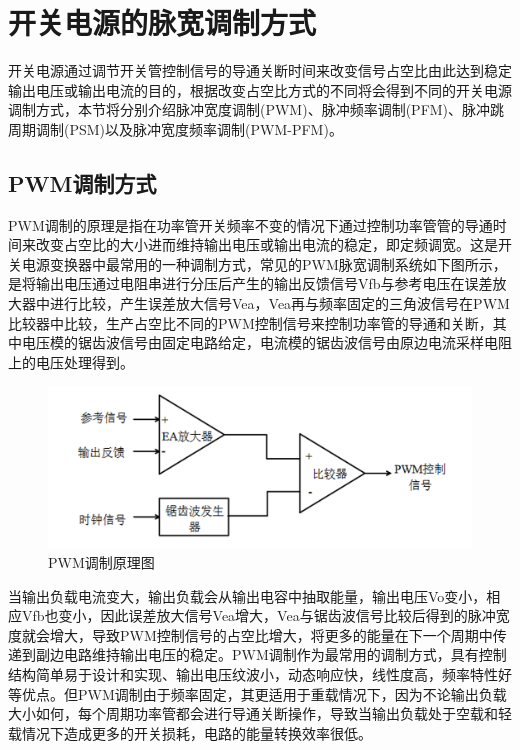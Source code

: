 								


\section{开关电源的脉宽调制方式}
开关电源通过调节开关管控制信号的导通关断时间来改变信号占空比由此达到稳定输出电压或输出电流的目的，根据改变占空比方式的不同将会得到不同的开关电源调制方式，本节将分别介绍脉冲宽度调制(PWM)、脉冲频率调制(PFM)、脉冲跳周期调制(PSM)以及脉冲宽度频率调制(PWM-PFM)。

\subsection{PWM调制方式}
PWM调制的原理是指在功率管开关频率不变的情况下通过控制功率管管的导通时间来改变占空比的大小进而维持输出电压或输出电流的稳定，即定频调宽。这是开关电源变换器中最常用的一种调制方式，常见的PWM脉宽调制系统如下图所示，是将输出电压通过电阻串进行分压后产生的输出反馈信号Vfb与参考电压在误差放大器中进行比较，产生误差放大信号Vea，Vea再与频率固定的三角波信号在PWM比较器中比较，生产占空比不同的PWM控制信号来控制功率管的导通和关断，其中电压模的锯齿波信号由固定电路给定，电流模的锯齿波信号由原边电流采样电阻上的电压处理得到。

\begin{figure}[htbp] 
    \centering
    \includegraphics[width=0.8\linewidth]{figures/PWM调制1.png}
    \caption{PWM调制原理图}
    \label{fig:PWM调制1}
\end{figure}

当输出负载电流变大，输出负载会从输出电容中抽取能量，输出电压Vo变小，相应Vfb也变小，因此误差放大信号Vea增大，Vea与锯齿波信号比较后得到的脉冲宽度就会增大，导致PWM控制信号的占空比增大，将更多的能量在下一个周期中传递到副边电路维持输出电压的稳定。PWM调制作为最常用的调制方式，具有控制结构简单易于设计和实现、输出电压纹波小，动态响应快，线性度高，频率特性好等优点。但PWM调制由于频率固定，其更适用于重载情况下，因为不论输出负载大小如何，每个周期功率管都会进行导通关断操作，导致当输出负载处于空载和轻载情况下造成更多的开关损耗，电路的能量转换效率很低。

